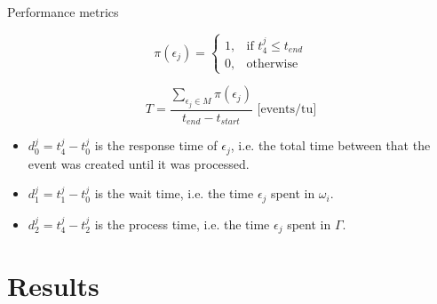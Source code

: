 \documentclass{beamer}
\begin{document}
    \begin{frame}{Performance metrics}

        \[
            \pi(\epsilon_j) =
        \begin{cases}
            1, & \text{if } t_4^j \leq t_{end} \\
            0, & \text{otherwise}
        \end{cases}
        \]

        $$
        T = \frac{\sum_{\epsilon_j \in M}{\pi(\epsilon_j)}}{t_{end} -
        t_{start}} \text{ [events/tu]}
        $$

        \begin{itemize}

            \item $d_0^j = t_4^j - t_0^j$ is the response time of $\epsilon_j$,
                i.e.  the total time between that the event was created until
                it was processed.

            \item $d_1^j = t_1^j - t_0^j$ is the wait time, i.e. the time
                $\epsilon_j$ spent in $\omega_i$.

            \item $d_2^j = t_4^j - t_2^j$ is the process time, i.e. the time
                $\epsilon_j$ spent in $\Gamma$.

        \end{itemize}

    \end{frame}

%
%
%
%
%
%
%

    \section{Results}
\end{document}
